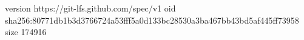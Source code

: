 version https://git-lfs.github.com/spec/v1
oid sha256:80771db1b3d3766724a53fff5a0d133bc28530a3ba467bb43bd5af445ff73958
size 174916
